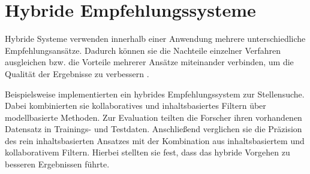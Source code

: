 \section{Hybride Empfehlungssysteme}
\label{ch:empfehlungssysteme:hybrideEmpfehlungssysteme}
Hybride Systeme verwenden innerhalb einer Anwendung mehrere unterschiedliche Empfehlungsansätze. Dadurch können sie die Nachteile einzelner Verfahren ausgleichen bzw. die Vorteile mehrerer Ansätze miteinander verbinden, um die Qualität der Ergebnisse zu verbessern \cite[S. 199f.]{recommenderSystems:2016}\cite[S. 8]{malinowski:2008}.

Beispielsweise implementierten \textcite[S. 1ff.]{combiningCbAndCFCostSensitiveApproach:2017} ein hybrides Empfehlungssystem zur Stellensuche. Dabei kombinierten sie kollaboratives und inhaltsbasiertes Filtern über modellbasierte Methoden. Zur Evaluation teilten die Forscher ihren vorhandenen Datensatz in Trainings- und Testdaten. Anschließend verglichen sie die Präzision des rein inhaltsbasierten Ansatzes mit der Kombination aus inhaltsbasiertem und kollaborativem Filtern. Hierbei stellten sie fest, dass das hybride Vorgehen zu besseren Ergebnissen führte.

